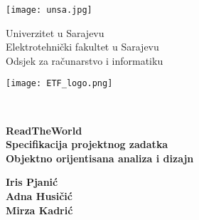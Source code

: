 \documentclass[12pt, a4paper]{report}
\begin{document}
	\begin{titlepage}
		\newcommand{\HRule}{\rule{\linewidth}{1mm}} 
		\noindent
		{\large
			\begin{minipage}{0.2\textwidth}
				\begin{center} 
					\texttt{[image: unsa.jpg]}
				\end{center}
			\end{minipage}
			\begin{minipage}{0.58\textwidth}
				\begin{center} \large
					Univerzitet u Sarajevu\\
					Elektrotehnički fakultet u Sarajevu\\
					Odsjek za računarstvo i informatiku\\
				\end{center}
			\end{minipage}
			\begin{minipage}{0.2\textwidth}
				\begin{center} 
					\texttt{[image: ETF\_logo.png]}
				\end{center}
			\end{minipage}
			\\[6 cm] 
			
			
			\begin{center}
				\LARGE 
				\bfseries 
				ReadTheWorld \\
				\large 
				Specifikacija projektnog zadatka   \\[0.5cm]
				
				Objektno orijentisana analiza i dizajn
				\\[6.0 cm] 
			\end{center}	 		
			

			\begin{minipage}{0.9\textwidth}
				\begin{flushright}
					\textbf{Iris Pjanić}  \\
					\textbf{Adna Husičić}  \\			
					\textbf{Mirza Kadrić}  \\
				\end{flushright}
			\end{minipage}\\[1 cm]
		}
	\end{titlepage}
	\renewcommand{\chaptermark}[1]{\markboth{#1}{}}
\end{document}
